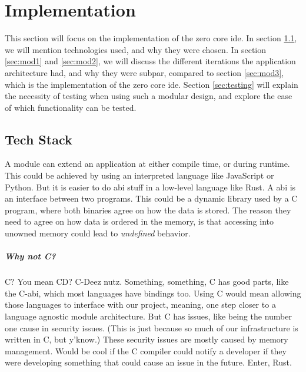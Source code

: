 \chapter{Implementation} \label{cha:impl}

This section will focus on the implementation of the zero core \gls{ide}. In
section \ref{sec:stack}, we will mention technologies used, and why they were
chosen. In section \ref{sec:mod1} and \ref{sec:mod2}, we will discuss the
different iterations the application architecture had, and why they were subpar,
compared to section \ref{sec:mod3}, which is the implementation of the zero core
\gls{ide}. Section \ref{sec:testing} will explain the necessity of testing when
using such a modular design, and explore the ease of which functionality can be
tested.

\section{Tech Stack} \label{sec:stack}

A module can extend an application at either compile time, or during runtime.
This could be achieved by using an interpreted language like JavaScript or
Python. But it is easier to do \gls{abi} stuff in a low-level language like
Rust. A \gls{abi} is an interface between two programs. This could be a
dynamic library used by a C program, where both binaries agree on how the data
is stored. The reason they need to agree on how data is ordered in the memory,
is that accessing into unowned memory could lead to \textit{undefined} behavior.


\paragraph{Why not C?} C? You mean CD? C-Deez nutz. Something, something, C has
good parts, like the C-\gls{abi}, which most languages have bindings too. Using
C would mean allowing those languages to interface with our project, meaning,
one step closer to a language agnostic module architecture. But C has issues,
like being the number one cause in security issues. (This is just because
so much of our infrastructure is written in C, but y'know.) These security
issues are mostly caused by memory management. Would be cool if the C compiler
could notify a developer if they were developing something that could cause an
issue in the future. Enter, Rust.

